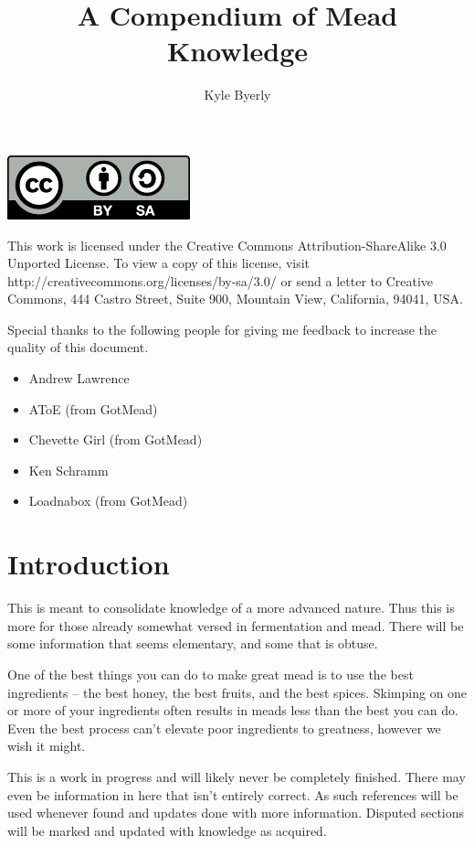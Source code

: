 \documentclass{article}
\title{A Compendium of Mead Knowledge}
\author{
  Kyle Byerly\\
}
\begin{document}
\maketitle
\newpage

\begin{center}
\includegraphics{by-sa.pdf}
\end{center}
This work is licensed under the Creative Commons Attribution-ShareAlike 3.0 Unported License. To view a copy of this license, visit http://creativecommons.org/licenses/by-sa/3.0/ or send a letter to Creative Commons, 444 Castro Street, Suite 900, Mountain View, California, 94041, USA.

\newpage

Special thanks to the following people for giving me feedback to increase the quality of this document.

\begin{itemize}
\item Andrew Lawrence
\item AToE (from GotMead)
\item Chevette Girl (from GotMead)
\item Ken Schramm
\item Loadnabox (from GotMead)
\end{itemize}


\newpage

\tableofcontents
\newpage

\section{Introduction}
 This is meant to consolidate knowledge of a more advanced nature. Thus this is more for those already somewhat 
 versed in fermentation and mead. There will be some information that seems elementary, and some that is obtuse.
 
 One of the best things you can do to make great mead is to use the best ingredients -- the best honey, the best 
 fruits, and the best spices. Skimping on one or more of your ingredients often results in meads less than the 
 best you can do. Even the best process can't elevate poor ingredients to greatness, however we wish it might.

 This is a work in progress and will likely never be completely finished. There may even be information in
 here that isn't entirely correct. As such references will be used whenever found and updates done with more 
 information. Disputed sections will be marked and updated with knowledge as acquired.
\end{document}
